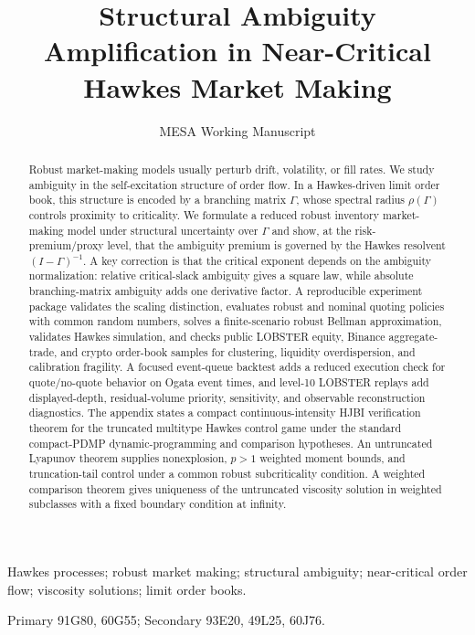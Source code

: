 \documentclass[review]{siamonline250211}
\title{Structural Ambiguity Amplification in Near-Critical Hawkes Market Making}
\author{MESA Working Manuscript}
\begin{document}
\maketitle

\begin{abstract}
Robust market-making models usually perturb drift, volatility, or fill rates.
We study ambiguity in the self-excitation structure of order flow. In a
Hawkes-driven limit order
book, this structure is encoded by a branching matrix $\Gamma$, whose spectral
radius $\rho(\Gamma)$ controls proximity to criticality. We formulate a reduced
robust inventory market-making model under structural uncertainty over
$\Gamma$ and show, at the risk-premium/proxy level, that the ambiguity premium
is governed by the Hawkes resolvent $(I-\Gamma)^{-1}$. A key correction is that
the critical exponent depends on the ambiguity normalization: relative
critical-slack ambiguity gives a square law, while absolute branching-matrix
ambiguity adds one derivative factor. A reproducible experiment package
validates the scaling distinction, evaluates robust and nominal quoting
policies with common random numbers, solves a finite-scenario robust Bellman
approximation, validates Hawkes simulation, and checks public LOBSTER equity,
Binance aggregate-trade, and crypto order-book samples
for clustering, liquidity overdispersion, and calibration fragility. A focused
event-queue backtest adds a reduced execution check for quote/no-quote
behavior on Ogata event times, and level-10 LOBSTER replays add displayed-depth,
residual-volume priority, sensitivity, and observable reconstruction
diagnostics. The appendix states a compact continuous-intensity HJBI
verification theorem for the truncated multitype Hawkes control game under the
standard compact-PDMP dynamic-programming and comparison hypotheses. An
untruncated Lyapunov theorem supplies
nonexplosion, $p>1$ weighted moment bounds, and truncation-tail control under a
common robust subcriticality condition. A weighted comparison theorem gives
uniqueness of the untruncated viscosity solution in weighted subclasses with a
fixed boundary condition at infinity.
\end{abstract}

\begin{keywords}
Hawkes processes; robust market making; structural ambiguity; near-critical order flow; viscosity solutions; limit order books.
\end{keywords}

\begin{AMS}
Primary 91G80, 60G55; Secondary 93E20, 49L25, 60J76.
\end{AMS}
\end{document}
